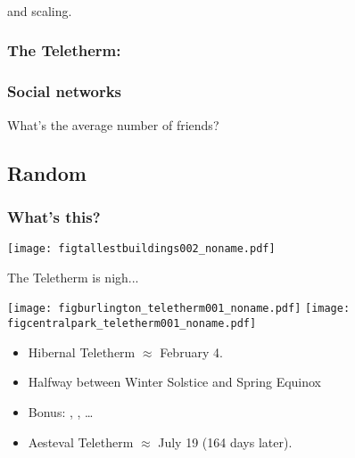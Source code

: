 \begin{frame}
  \frametitle{}
  
  and scaling.

  \cite{hill2008a}


\end{frame}

\begin{frame}
  \frametitle{The Teletherm:}
  


\end{frame}


\begin{frame}
  \frametitle{Social networks}

  What's the average number of friends?

\end{frame}


\subsection{Random}


\begin{frame}
  \frametitle{What's this?}
  
  \texttt{[image: figtallestbuildings002\_noname.pdf]}

\end{frame}


\begin{frame}

  \begin{block}{The Teletherm is nigh...}
    \begin{center}
    \texttt{[image: figburlington\_teletherm001\_noname.pdf]}
    \texttt{[image: figcentralpark\_teletherm001\_noname.pdf]}
    \end{center}
    \begin{itemize}
    \item 
      Hibernal Teletherm $\approx$ February 4.
    \item 
      Halfway between Winter Solstice and Spring Equinox
    \item 
      Bonus: , 
      , \ldots
    \item 
      Aesteval Teletherm $\approx$ July 19 (164 days later).
    \end{itemize}
  \end{block}

\end{frame}

